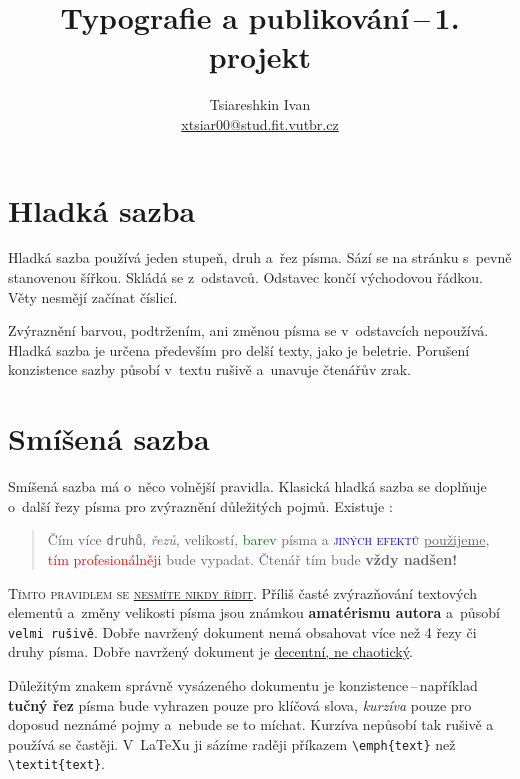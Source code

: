\documentclass[a4paper, 10pt, twocolumn]{article}
\title{Typografie a publikování\,--\,1. projekt}
\author{Tsiareshkin Ivan \\ \href{mailto:xtsiar00@stud.fit.vutbr.cz}{xtsiar00@stud.fit.vutbr.cz}}
\date{}
\begin{document}
    \maketitle    
    
    \section{Hladká sazba}\label{hladka}
        Hladká sazba používá jeden stupeň, druh a~řez písma. Sází se na stránku s~pevně stanovenou šířkou. Skládá se z~odstavců. Odstavec končí východovou řádkou. Věty nesmějí začínat číslicí.
    
        Zvýraznění barvou, podtržením, ani změnou písma se v~odstavcích nepoužívá. Hladká sazba je určena především pro delší texty, jako je beletrie. Porušení konzistence sazby působí v~textu rušivě a~unavuje čtenářův zrak.
    
    \section{Smíšená sazba}\label{smisena}  
        Smíšená sazba má o~něco volnější pravidla. Klasická hladká sazba se doplňuje o~další řezy písma pro zvýraznění důležitých pojmů. Existuje :
    
        \begin{quotation}
            Čím více \texttt{druhů}, \textit{řezů}, {\tiny velikostí}, \textcolor{green}{barev} písma a \textcolor{blue}{\textsc{jiných efektů}} \underline{použijeme}, \textcolor{red}{tím profesionálněji} bude {\selectfont{dokument}} vypadat. Čtenář tím bude \textbf{\Huge{vždy nadšen!}}
        \end{quotation}
    
        \textsc{Tímto pravidlem se \underline{nesmíte nikdy řídit}.}
        Příliš časté zvýrazňování textových elementů a~změny {\scriptsize velikosti} písma jsou známkou \textbf{amatérismu autora} a~působí \texttt{velmi rušivě}. Dobře navržený dokument nemá obsahovat více než 4 řezy či druhy písma. Dobře navržený dokument je \underline{decentní, ne chaotický}.
    
        Důležitým znakem správně vysázeného dokumentu je konzistence\,--\,například \textbf{tučný řez} písma bude vyhrazen pouze pro klíčová slova, \textit{kurzíva} pouze pro doposud neznámé pojmy a~nebude se to míchat. Kurzíva nepůsobí tak rušivě a používá se častěji. V~{\LaTeX}u ji sázíme raději příkazem \verb|\emph{text}| než \verb|\textit{text}|.
    
\end{document}
